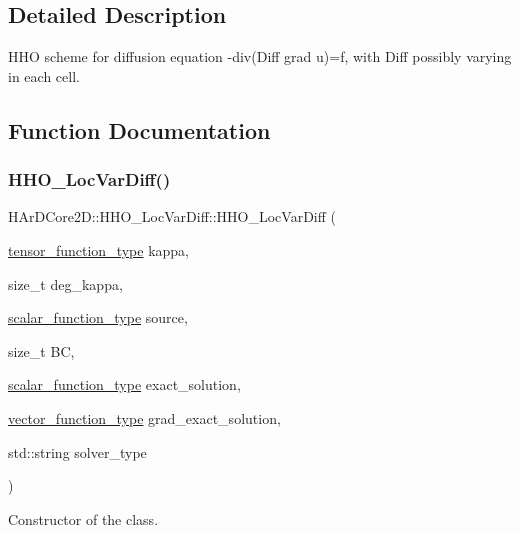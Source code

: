 \subsection{Detailed Description}
H\+HO scheme for diffusion equation -\/div(Diff grad u)=f, with Diff possibly varying in each cell. 



\subsection{Function Documentation}
\mbox{\label{group__HHO__LocVarDiff_ga57daa01081647a684101ea854b4336b4}} 
\subsubsection{\texorpdfstring{H\+H\+O\+\_\+\+Loc\+Var\+Diff()}{HHO\_LocVarDiff()}}
{\footnotesize\ttfamily H\+Ar\+D\+Core2\+D\+::\+H\+H\+O\+\_\+\+Loc\+Var\+Diff\+::\+H\+H\+O\+\_\+\+Loc\+Var\+Diff (\begin{DoxyParamCaption}\item[{\hyperlink{classHArDCore2D_1_1HHO__LocVarDiff_a65b5cbf39a759b6ce3b097536f32f5cb}{tensor\+\_\+function\+\_\+type}}]{kappa,  }\item[{size\+\_\+t}]{deg\+\_\+kappa,  }\item[{\hyperlink{classHArDCore2D_1_1HHO__LocVarDiff_a8b00c073fd089f8c5a642f8dab63f2a3}{scalar\+\_\+function\+\_\+type}}]{source,  }\item[{size\+\_\+t}]{BC,  }\item[{\hyperlink{classHArDCore2D_1_1HHO__LocVarDiff_a8b00c073fd089f8c5a642f8dab63f2a3}{scalar\+\_\+function\+\_\+type}}]{exact\+\_\+solution,  }\item[{\hyperlink{classHArDCore2D_1_1HHO__LocVarDiff_a9951a7b7866719b71956c455f1e3d937}{vector\+\_\+function\+\_\+type}}]{grad\+\_\+exact\+\_\+solution,  }\item[{std\+::string}]{solver\+\_\+type }\end{DoxyParamCaption})}



Constructor of the class. 


